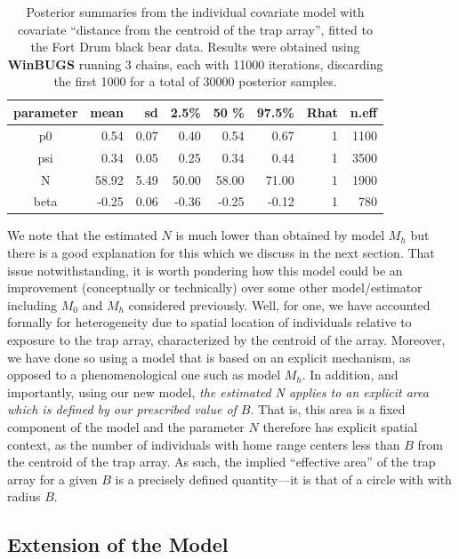 \begin{table}[ht]
  \caption{
    Posterior summaries from the individual covariate model with
    covariate ``distance from the centroid of the trap array'', 
 fitted to the Fort Drum black
    bear data. Results 
    were obtained using {\bf WinBUGS}
    running 3 chains, each with 11000 iterations, discarding the
    first 1000 for a total of 30000 posterior samples. 
}
\begin{tabular}{crrrrrrr} \hline \hline
 parameter &  mean&  sd  &   2.5\% &  50 \%  &   97.5\% &Rhat& n.eff  \\ \hline
p0         &0.54  &0.07  & 0.40   &  0.54  &  0.67  &  1 & 1100  \\
psi        &0.34  &0.05  & 0.25   &  0.34  &  0.44  &  1 & 3500 \\
N          &58.92 & 5.49 & 50.00  &  58.00 &  71.00 &   1&  1900 \\
beta       &-0.25 & 0.06 & -0.36  &  -0.25 &  -0.12 &   1&   780 \\ \hline
\end{tabular}
\label{closed.tab.bear2}
\end{table}



We note that the estimated $N$ is much lower than obtained by model
$M_h$ but there is a good explanation for this which we discuss in the
next section.
That issue notwithstanding, it is worth pondering how
this model could be an improvement (conceptually or technically) over
some other model/estimator including $M_0$ and $M_h$ considered
previously. Well, for one, we have accounted formally for
heterogeneity due to spatial location of individuals relative to
exposure to the trap array, characterized by the centroid of the
array. Moreover, we have done so using a model that is based on an
explicit mechanism, as opposed to a phenomenological one such as model
$M_h$. In addition, and importantly, using our new model, {\it the estimated
  N applies to an explicit area which is defined by our prescribed
  value of $B$}. That is, this area is a fixed component of the model
and the parameter $N$ therefore has explicit spatial context, as the
number of individuals with home range centers less than $B$ from the
centroid of the trap array. As such, the implied ``effective area'' of
the trap array for a given $B$ is a precisely defined quantity---it is
that of a circle with with radius $B$.


\subsection{Extension of the Model}

